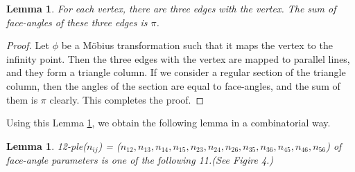 \documentclass[suppldata, dvipdfmx]{interact}
\theoremstyle{plain}%
\newtheorem{lemma}[theorem]{Lemma}
\theoremstyle{definition}
\theoremstyle{remark}
\theoremstyle{problemstyle}
\begin{document}
\begin{lemma}\label{sum}
 For each vertex, there are three edges with the vertex. The sum of
 face-angles of these three edges is $\pi$.
\end{lemma}

\begin{proof}
 Let $\phi$ be a M\"obius transformation such that it maps the vertex to
 the infinity point. Then the three edges with the vertex are mapped to
 parallel lines, and they form a triangle column. If we consider a
 regular section of the triangle column, then the angles of the section
 are equal to face-angles, and the sum of them is $\pi$ clearly. This
 completes the proof.
\end{proof}

 Using this Lemma \ref{sum}, we obtain the following lemma in a combinatorial way.
\begin{lemma}\label{combination}
 12-ple($n_{ij}$) = ($n_{12}, n_{13}, n_{14}, n_{15}, n_{23}, n_{24},
 n_{26}, n_{35}, n_{36}, n_{45}, n_{46}, n_{56}$) of face-angle
 parameters is one of the following 11.(See Figire 4.)
\end{lemma}
\end{document}

